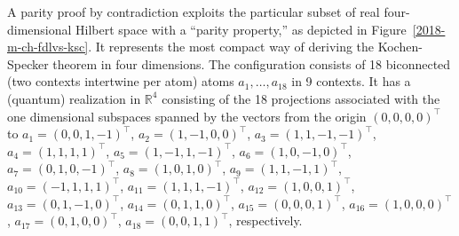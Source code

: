 {\color{OliveGreen}\bproof
A parity proof by contradiction
exploits the particular subset of real four-dimensional Hilbert space with a ``parity property,'' as depicted in Figure~\ref{2018-m-ch-fdlvs-ksc}.
It represents the most compact way of deriving the Kochen-Specker theorem in four dimensions.
The configuration consists of 18 biconnected (two contexts intertwine per atom)
atoms $a_1, \ldots , a_{18}$ in 9 contexts.
It has a (quantum) realization in $\mathbb{R}^4$
consisting of the 18 projections associated with the one dimensional subspaces spanned by
the vectors from the origin $(0,0,0,0)^\intercal$ to
$a_1=\left(   0,0,1,-1     \right)^\intercal    $,
$a_2=\left(   1,-1,0,0     \right)^\intercal    $,
$a_3=\left(   1,1,-1,-1    \right)^\intercal   $,
$a_4=\left(   1,1,1,1      \right)^\intercal     $,
$a_5=\left(   1,-1,1,-1    \right)^\intercal  $,
$a_6=\left(   1,0,-1,0     \right)^\intercal   $,
$a_7=\left(   0,1,0,-1   \right)^\intercal   $,
$a_8=\left(   1,0,1,0    \right)^\intercal    $,
$a_9=\left(   1,1,-1,1   \right)^\intercal   $,
$a_{10}=\left(-1,1,1,1   \right)^\intercal    $,
$a_{11}=\left(1,1,1,-1   \right)^\intercal    $,
$a_{12}=\left(1,0,0,1    \right)^\intercal     $,
$a_{13}=\left(0,1,-1,0   \right)^\intercal    $,
$a_{14}=\left(0,1,1,0    \right)^\intercal    $,
$a_{15}=\left(0,0,0,1    \right)^\intercal    $,
$a_{16}=\left(1,0,0,0    \right)^\intercal    $,
$a_{17}=\left(0,1,0,0    \right)^\intercal    $,
$a_{18}=\left(0,0,1,1    \right)^\intercal    $,
 respectively.\cite[-15mm]{cabello:210401}




\begin{figure}
\begin{center}
\end{center}
\end{figure}}
